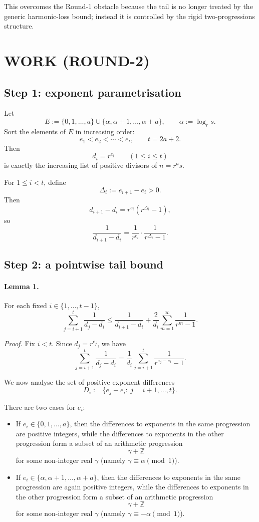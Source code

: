 This overcomes the Round-1 obstacle because the tail is no longer treated by the generic harmonic-loss bound; instead it is controlled by the rigid two-progressions structure.

\section{WORK (ROUND-2)}

\subsection*{Step 1: exponent parametrisation}

Let
\[
E:=\{0,1,\dots,a\}\cup \{\alpha,\alpha+1,\dots,\alpha+a\},
\qquad \alpha:=\log_r s.
\]
Sort the elements of \(E\) in increasing order:
\[
e_1<e_2<\cdots<e_t,
\qquad t=2a+2.
\]
Then
\[
d_i=r^{e_i}\qquad (1\leq i\leq t)
\]
is exactly the increasing list of positive divisors of \(n=r^a s\).

For \(1\leq i<t\), define
\[
\Delta_i:=e_{i+1}-e_i>0.
\]
Then
\[
d_{i+1}-d_i
=
r^{e_i}(r^{\Delta_i}-1),
\]
so
\[
\frac{1}{d_{i+1}-d_i}
=
\frac{1}{r^{e_i}}\cdot \frac{1}{r^{\Delta_i}-1}.
\]

\subsection*{Step 2: a pointwise tail bound}

\paragraph{Lemma 1.}
For each fixed \(i\in\{1,\dots,t-1\}\),
\[
\sum_{j=i+1}^{t}\frac{1}{d_j-d_i}
\leq
\frac{1}{d_{i+1}-d_i}
+
\frac{2}{d_i}\sum_{m=1}^{\infty}\frac{1}{r^m-1}.
\]

\emph{Proof.}
Fix \(i<t\). Since \(d_j=r^{e_j}\), we have
\[
\sum_{j=i+1}^{t}\frac{1}{d_j-d_i}
=
\frac{1}{d_i}\sum_{j=i+1}^{t}\frac{1}{r^{e_j-e_i}-1}.
\tag{1}
\]

We now analyse the set of positive exponent differences
\[
D_i:=\{e_j-e_i:\ j=i+1,\dots,t\}.
\]

There are two cases for \(e_i\):

\begin{itemize}
\item If \(e_i\in\{0,1,\dots,a\}\), then the differences to exponents in the same progression are positive integers, while the differences to exponents in the other progression form a subset of an arithmetic progression
\[
\gamma+\mathbb Z
\]
for some non-integer real \(\gamma\) (namely \(\gamma\equiv \alpha \pmod{1}\)).

\item If \(e_i\in\{\alpha,\alpha+1,\dots,\alpha+a\}\), then the differences to exponents in the same progression are again positive integers, while the differences to exponents in the other progression form a subset of an arithmetic progression
\[
\gamma+\mathbb Z
\]
for some non-integer real \(\gamma\) (namely \(\gamma\equiv -\alpha \pmod{1}\)).
\end{itemize}

